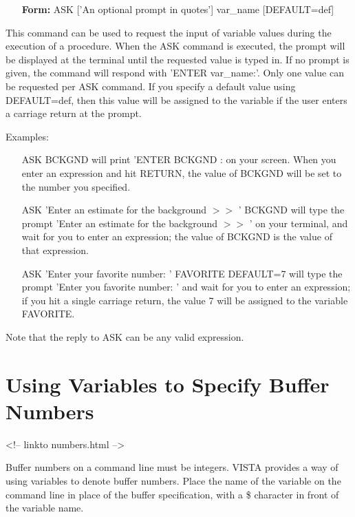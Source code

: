 \begin{itemize}
  \item[\textbf{Form: } ASK {['An optional prompt in quotes']} var\_name {[DEFAULT=def]}\hfill]{}
\end{itemize}

This command can be used to request the input of variable values during the
execution of a procedure.  When the ASK command is executed, the prompt
will be displayed at the terminal until the requested value is typed in.
If no prompt is given, the command will respond with 'ENTER var\_name:'.
Only one value can be requested per ASK command. If you specify a default
value using DEFAULT=def, then this value will be assigned to the variable
if the user enters a carriage return at the prompt.

Examples:
\begin{itemize}
  \item[ASK BCKGND\hfill]{will print 'ENTER BCKGND : on your screen.  When
       you enter an expression and hit RETURN, the value of BCKGND will be
       set to the number you specified.}

  \item[ASK 'Enter an estimate for the background $>>$ ' BCKGND \hfill]
       {will type the prompt 'Enter an estimate for the background $>>$ ' on
       your terminal, and wait for you to enter an expression; the value of
       BCKGND is the value of that expression.}

  \item[ASK 'Enter your favorite number: ' FAVORITE DEFAULT=7\hfill]
       { will type the prompt 'Enter you favorite number: ' and wait for
       you to enter an expression; if you hit a single carriage return, the
       value 7 will be assigned to the variable FAVORITE.}

\end{itemize}

Note that the reply to ASK can be any valid expression.

\section{Using Variables to Specify Buffer Numbers}
\begin{rawhtml}
<!-- linkto numbers.html -->
\end{rawhtml}

Buffer numbers on a command line must be integers.  VISTA provides a way of
using variables to denote buffer numbers.  Place the name of the variable
on the command line in place of the buffer specification, with a \$
character in front of the variable name.

